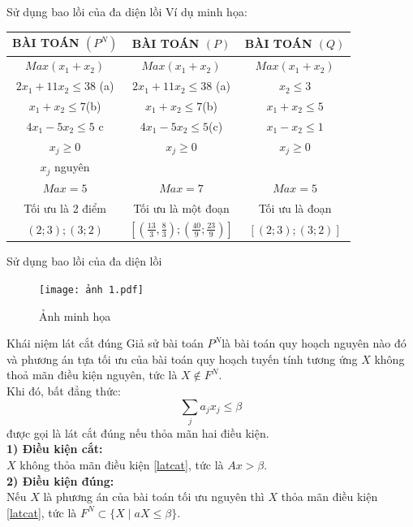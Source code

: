 \documentclass[10pt]{beamer}
\begin{document}
\begin{frame}{Sử dụng bao lồi của đa diện lồi}
    Ví dụ minh họa:\\
    \begin{tabular}{|c|c|c|}
    \hline
     BÀI TOÁN $(P^N)$  & BÀI TOÁN $(P)$& BÀI TOÁN $(Q)$  \\
     \hline
       $Max (x_1+x_2)$  & $Max (x_1+x_2) $ &$Max (x_1+x_2)$ \\
$2x_1+11x_2\le 38$ \quad (a) & $2x_1+11x_2 \le 38$  \quad (a) & $x_2\le 3$\\
$x_1+x_2\le 7$\quad (b) &$x_1+x_2\le 7$\quad (b) & $x_1+x_2\le 5$\\
$4x_1-5x_2\le 5$ \quad c & $4x_1-5x_2\le 5$\quad (c) & $x_1-x_2\le 1$\\
$x_j\ge 0$ & $x_j\ge 0$ & $x_j\ge 0$\\
$x_j$ nguyên & &\\
\hline 
$Max= 5$& $Max=7$ &$Max=5$\\
Tối ưu là 2 điểm & Tối ưu là một đoạn & Tối ưu là đoạn\\
$(2;3);(3;2)$&$[(\frac{13}{3},\frac{8}{3}); (\frac{40}{9};\frac{23}{9})]$&$[(2;3);(3;2)]$\\
\hline
    \end{tabular}
\end{frame}

\begin{frame}{Sử dụng bao lồi của đa diện lồi}
    \begin{figure}[h]
        \centering
        \texttt{[image: ảnh 1.pdf]}
        \caption{Ảnh minh họa }
        \label{fig:enter-label}
    \end{figure}
\end{frame}

\begin{frame}{Khái niệm lát cắt đúng}
     Giả sử bài toán $P^N$là bài toán quy hoạch nguyên nào đó và phương án tựa tối ưu của bài toán quy hoạch tuyến tính tương ứng $X$ không thoả mãn điều kiện 
nguyên, tức là $X \notin  F^N$.\\
Khi đó, bất đẳng thức:
    $$\sum _j a_jx_j \le \beta$$\label{latcat}
    được gọi là lát cắt đúng nếu thỏa mãn hai điều kiện.\\
    
       \textbf{ 1) Điều kiện cắt:} \\
        $X$ không thỏa mãn điều kiện \eqref{latcat}, tức là $Ax > \beta$.\\
    \textbf{2) Điều kiện đúng:}\\
       Nếu $X$ là phương án của bài toán tối ưu nguyên thì $X$ thỏa mãn điều kiện \eqref{latcat}, tức là 
 $F^N \subset \{X\mid aX\le \beta\}$.\\
    \end{frame}
\end{document}
